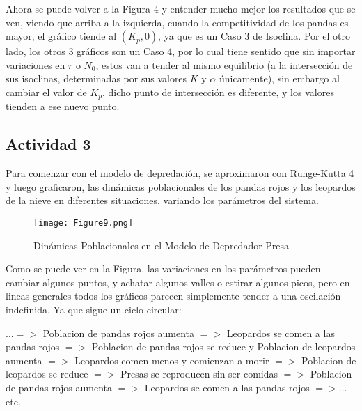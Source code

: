 \documentclass{article}
\begin{document}
\noindent Ahora se puede volver a la Figura 4 y entender mucho mejor los resultados que se ven, viendo que arriba a la izquierda, cuando la competitividad de los pandas es mayor, el gráfico tiende al $(K_p, 0)$, ya que es un Caso 3 de Isoclina. Por el otro lado, los otros 3 gráficos son un Caso 4, por lo cual tiene sentido que sin importar variaciones en $r$ o $N_0$, estos van a tender al mismo equilibrio (a la intersección de sus isoclinas, determinadas por sus valores $K$ y $\alpha$ únicamente), sin embargo al cambiar el valor de $K_p$, dicho punto de intersección es diferente, y los valores tienden a ese nuevo punto.





\subsection*{Actividad 3}

\noindent Para comenzar con el modelo de depredación, se aproximaron con Runge-Kutta 4 y luego graficaron, las dinámicas poblacionales de los pandas rojos y los leopardos de la nieve en diferentes situaciones, variando los parámetros del sistema.

\begin{figure}[ht]
    \centering
    \caption{Dinámicas Poblacionales en el Modelo de Depredador-Presa}
    \texttt{[image: Figure9.png]}
    \label{fig:Image 1.1}
\end{figure}

\vspace{14\baselineskip}

\noindent Como se puede ver en la Figura, las variaciones en los parámetros pueden cambiar algunos puntos, y achatar algunos valles o estirar algunos picos, pero en lineas generales todos los gráficos parecen simplemente tender a una oscilación indefinida. Ya que sigue un ciclo circular: \vspace{1\baselineskip}

\noindent ...$=>$ Poblacion de pandas rojos aumenta $=>$ Leopardos se comen a las pandas rojos $=>$ Poblacion de pandas rojos se reduce y Poblacion de leopardos aumenta $=>$ Leopardos comen menos y comienzan a morir $=>$ Poblacion de leopardos se reduce $=>$ Presas se reproducen sin ser comidas $=>$ Poblacion de pandas rojos aumenta $=>$ Leopardos se comen a las pandas rojos $=>$... etc.
\vspace{1\baselineskip}
\end{document}
